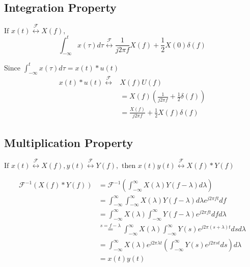 \subsection{Integration Property}
\begin{definition}
    $\text{If } x(t) \overset{\mathcal{F}}{\leftrightarrow} X(f),$
\begin{equation*}
\int_{-\infty}^{t} x(\tau) d\tau \overset{\mathcal{F}}{\leftrightarrow} \frac{1}{j2\pi f} X(f) + \frac{1}{2} X(0) \delta(f)
\end{equation*}
\end{definition}

\begin{derivation}
    Since $\int_{-\infty}^{t} x(\tau) d\tau = x(t) * u(t)$
    \begin{align*}
        x(t) * u(t) \overset{\mathcal{F}}{\leftrightarrow} &X(f) U(f) \\
        &= X(f) \left( \frac{1}{j2\pi f} + \frac{1}{2} \delta(f) \right) \\
        &= \frac{X(f)}{j2\pi f} + \frac{1}{2} X(f) \delta(f)
        \end{align*}        
\end{derivation}

\begin{example}
\end{example}

\subsection{Multiplication Property}
\begin{definition}
    $ \text{If } x(t) \overset{\mathcal{F}}{\leftrightarrow} X(f), y(t) \overset{\mathcal{F}}{\leftrightarrow} Y(f), \text{ then } x(t) y(t) \overset{\mathcal{F}}{\leftrightarrow} X(f) * Y(f)$
\end{definition}

\begin{derivation}
    \begin{align*}
        \mathcal{F}^{-1} \left( X(f) * Y(f) \right) &= \mathcal{F}^{-1} \left( \int_{-\infty}^{\infty} X(\lambda) Y(f - \lambda) d\lambda \right) \\
        &= \int_{-\infty}^{\infty} \int_{-\infty}^{\infty} X(\lambda) Y(f - \lambda) d\lambda e^{j 2 \pi f t} df \\
        &= \int_{-\infty}^{\infty} X(\lambda) \int_{-\infty}^{\infty} Y(f - \lambda) e^{j2\pi ft} df d\lambda \\
        &\overset{s=f-\lambda}{=} \int_{-\infty}^{\infty} X(\lambda) \int_{-\infty}^{\infty} Y(s) e^{j2\pi (s + \lambda)t} ds d\lambda \\
        &= \int_{-\infty}^{\infty} X(\lambda) e^{j2\pi \lambda t} \left( \int_{-\infty}^{\infty} Y(s) e^{j2\pi st} ds \right) d\lambda \\
        &= x(t) y(t)
        \end{align*}
\end{derivation}
